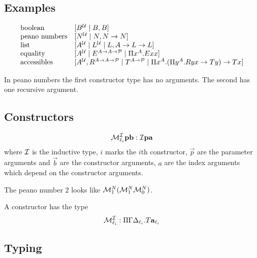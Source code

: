 \subsection{Examples}
$$
    \begin{array}{lll}
        \text{boolean}
        &
        [B^{\cal U} \mid B, B]
        \\
        \text{peano numbers}
        &
        [N^{\cal U} \mid N, N\to N]
        \\
        \text{list}
        &
        [A^{\cal U} \mid L^{\cal U} \mid L, A \to L\to L]
        \\
        \text{equality}
        &
        [A^{\cal U}
        \mid E^{A \to A \to {\cal P}}
        \mid \Pi x^A. E x x]
        \\
        \text{accessibles}
        &
        [
            A^{\cal U}, R^{A \to A \to {\cal P}}
            \mid
            T^{A \to {\cal P}}
            \mid
            \Pi x^A. (\Pi y^A. R y x \to T y) \to T x
        ]
    \end{array}
$$

In peano numbers the first constructor type has no arguments. The second has one
recursive argument.




\subsection{Constructors}

$$
    {\cal M}^{\cal I}_{\ell_i} {\mathbf p} {\mathbf b}: {\cal I} {\mathbf p} {\mathbf a}
$$
where ${\cal I}$ is the inductive type, $i$ marks the $i$th constructor, $\vec p$ are
the parameter arguments and $\vec b$ are the constructor arguments, $a$ are the
index arguments which depend on the constructor arguments.

The peano number $2$ looks like $ {\cal M}^N_1 ({\cal M}^N_1 {\cal M}^N_0) $.

A constructor has the type
$$
    {\cal M}^{\cal I}_{\ell_i} : \Pi \Gamma \Delta_{\ell_i}. T {{\mathbf a}}_{\ell_i}
$$





\subsection{Typing}

